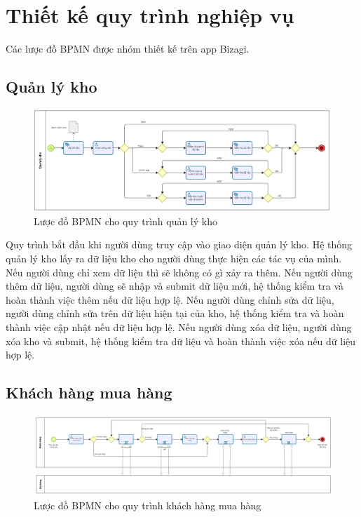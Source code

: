 \section{Thiết kế quy trình nghiệp vụ}

Các lược đồ BPMN được nhóm thiết kế trên app Bizagi.

\subsection{Quản lý kho}
\begin{figure}[!htp]
	\centering
	\includegraphics[width=17cm]{img/BPMN/Tho/warehouse.PNG}
	\newline
	\caption{Lược đồ BPMN cho quy trình quản lý kho}
\end{figure}

Quy trình bắt đầu khi người dùng truy cập vào giao diện quản lý kho. Hệ thống quản lý kho lấy ra dữ liệu kho cho người dùng thực hiện các tác vụ của mình. Nếu người dùng chỉ xem dữ liệu thì sẽ không có gì xảy ra thêm. Nếu người dùng thêm dữ liệu, người dùng sẽ nhập và submit dữ liệu mới, hệ thống kiểm tra và hoàn thành việc thêm nếu dữ liệu hợp lệ. Nếu người dùng chỉnh sửa dữ liệu, người dùng chỉnh sửa trên dữ liệu hiện tại của kho, hệ thống kiểm tra và hoàn thành việc cập nhật nếu dữ liệu hợp lệ. Nếu người dùng xóa dữ liệu, người dùng xóa kho và submit, hệ thống kiểm tra dữ liệu và hoàn thành việc xóa nếu dữ liệu hợp lệ.

\subsection{Khách hàng mua hàng}
\begin{figure}[!htp]
	\centering
	\includegraphics[width=17cm]{img/BPMN/customer_buy/customer_buy.png}
	\newline
	\caption{Lược đồ BPMN cho quy trình khách hàng mua hàng}
\end{figure}

